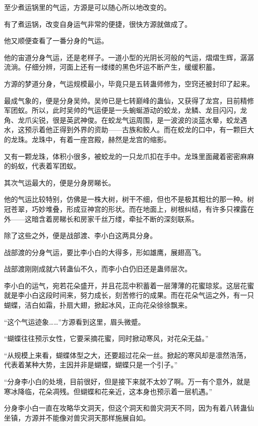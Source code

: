 \begin{this_body}
至少煮运锅里的气运，方源是可以随心所以地改变的。

有了煮运锅，改变自身运气非常的便捷，很快方源就做成了。

他又顺便查看了一番分身的气运。

他的宙道分身气运，还是老样子。一道小型的光阴长河般的气运，熠熠生辉，潺潺流淌。仔细分辨，河面上还有一缕缕的黑色坏运不断产生，缓缓积蓄。

方源的梦道分身，气运规模最小，毕竟只是五转蛊师修为，空窍还被封印了起来。

最成气象的，便是分身吴帅。吴帅已是七转巅峰的蛊仙，又获得了龙宫，目前精修军团蚁。所以，此时吴帅的气运便是一头蜿蜒游动的蛟龙，龙鳞、龙目闪闪，龙角、龙爪尖锐，很是英武神俊。在蛟龙气运周围，是一波波的淡蓝水晕，蛟龙遇水，这预示着他正得到外界的资助——古族和鲛人。而在蛟龙的口中，有一颗巨大的龙珠。龙珠中，有着一座宫殿，赫然是龙宫的缩影。

又有一颗龙珠，体积小很多，被蛟龙的一只龙爪扣在手中。龙珠里面藏着密密麻麻的蚂蚁，代表着军团蚁。

其次气运最大的，便是分身房睇长。

他的气运比较特别，仿佛是一株大树，树干不细，但也不是极其粗壮的那一种。树冠苍翠，巧妙堆叠，形成豆神宫的形状。而在地面上，树根纠结，有许多只裸露在外——这暗含着房睇长和房家千丝万缕，牵扯不断的深刻联系。

除了这些之外，便是战部渡、李小白这两具分身。

战部渡的分身气运，要比李小白的大得多，形如雄鹰，展翅高飞。

战部渡刚刚成就六转蛊仙不久，而李小白仍旧还是蛊师层次。

李小白的运气，宛若花朵盛开，并且花蕊中积蓄着一层薄薄的花蜜琼浆。这层花蜜就是李小白这段时间来，努力成长，刻苦修行的成果。而在花朵气运之外，有一只蝴蝶，洁白如霜，扑扇大翅，掀起冰风，正向花朵徐徐飘来。

“这个气运迹象……”方源看到这里，眉头微蹙。

“蝴蝶往往预示女性，它要采摘花蜜，同时掀动寒风，对花朵无益。”

“从规模上来看，蝴蝶体型之大，还要超过花朵一丝。掀起的寒风却是凛然浩荡，代表着某种大势，主因并非是蝴蝶，蝴蝶只是一个引子。”

“分身李小白的处境，目前很好，但是接下来就不太妙了啊。万一有个意外，就是寒冰降临，花朵凋残。但蝴蝶和花亲近，这本身也预示着一层机遇。”

分身李小白一直在攻略华文洞天，但这个洞天和兽灾洞天不同，因为有着八转蛊仙坐镇，方源并不能像对兽灾洞天那样施展自如。


\end{this_body}
